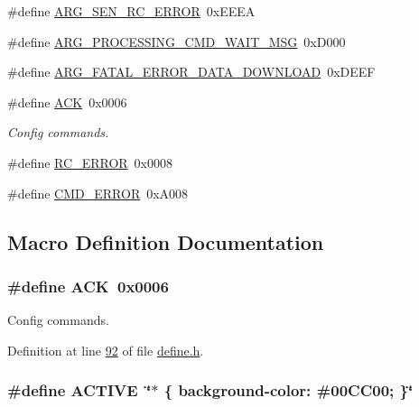 \begin{DoxyCompactItemize}
\item 
\#define \hyperlink{a00034_a2663000c914acad476f44813681c6b5e}{A\+R\+G\+\_\+\+S\+E\+N\+\_\+\+R\+C\+\_\+\+E\+R\+R\+O\+R}~0x\+E\+E\+E\+A
\item 
\#define \hyperlink{a00034_a89228259ebf351e938853637ef163a1b}{A\+R\+G\+\_\+\+P\+R\+O\+C\+E\+S\+S\+I\+N\+G\+\_\+\+C\+M\+D\+\_\+\+W\+A\+I\+T\+\_\+\+M\+S\+G}~0x\+D000
\item 
\#define \hyperlink{a00034_aedd62437ce5e337b31be5ae516039725}{A\+R\+G\+\_\+\+F\+A\+T\+A\+L\+\_\+\+E\+R\+R\+O\+R\+\_\+\+D\+A\+T\+A\+\_\+\+D\+O\+W\+N\+L\+O\+A\+D}~0x\+D\+E\+E\+F
\item 
\#define \hyperlink{a00034_a6f6489887e08bff4887d0bc5dcf214d8}{A\+C\+K}~0x0006
\begin{DoxyCompactList}\small\item\em Config commands. \end{DoxyCompactList}\item 
\#define \hyperlink{a00034_a993a04d3d34ab3326d1786c66e3aaa1a}{R\+C\+\_\+\+E\+R\+R\+O\+R}~0x0008
\item 
\#define \hyperlink{a00034_a1764a522e9c1a59a59be8757c69fa494}{C\+M\+D\+\_\+\+E\+R\+R\+O\+R}~0x\+A008
\end{DoxyCompactItemize}


\subsection{Macro Definition Documentation}
\hypertarget{a00034_a6f6489887e08bff4887d0bc5dcf214d8}{
\subsubsection[{A\+C\+K}]{\setlength{\rightskip}{0pt plus 5cm}\#define A\+C\+K~0x0006}}\label{a00034_a6f6489887e08bff4887d0bc5dcf214d8}


Config commands. 



Definition at line \hyperlink{a00034_source_l00092}{92} of file \hyperlink{a00034_source}{define.\+h}.

\hypertarget{a00034_a3a6d3cd70078e6046471ec528a09cd19}{
\subsubsection[{A\+C\+T\+I\+V\+E}]{\setlength{\rightskip}{0pt plus 5cm}\#define A\+C\+T\+I\+V\+E~\char`\"{}$\ast$ \{ background-\/color\+: \#00\+C\+C00; \}\char`\"{}}}\label{a00034_a3a6d3cd70078e6046471ec528a09cd19}


